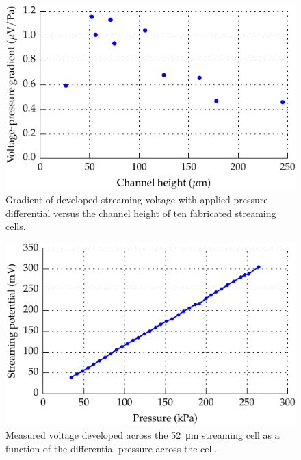 \documentclass[10pt,final,journal]{IEEEtran}
\begin{document}
        \begin{figure}
            \begin{center}
            \includegraphics[width=\linewidth]{graph_cellEfficiency}
            \end{center}
            \caption{Gradient of developed streaming voltage with applied pressure differential versus the channel height of ten fabricated streaming cells.}
            \label{fig:cellEfficiency}
        \end{figure}

        \begin{figure}
            \begin{center}
            \includegraphics[width=\linewidth]{graph_voltagePressure}
            \end{center}
            \caption{Measured voltage developed across the \SI{52}{\micro\metre} streaming cell as a function of the differential pressure across the cell.}
            \label{fig:cellVoltagePressure}
        \end{figure}
\end{document}
